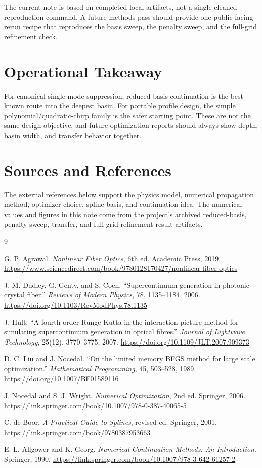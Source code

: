 \documentclass[11pt]{article}
\begin{document}
The current note is based on completed local artifacts, not a single cleaned
reproduction command. A future methods pass should provide one public-facing
rerun recipe that reproduces the basis sweep, the penalty sweep, and the
full-grid refinement check.

\section{Operational Takeaway}

For canonical single-mode suppression, reduced-basis continuation is the best
known route into the deepest basin. For portable profile design, the simple
polynomial/quadratic-chirp family is the safer starting point. These are not the
same design objective, and future optimization reports should always show depth,
basin width, and transfer behavior together.

\section{Sources and References}

The external references below support the physics model, numerical propagation
method, optimizer choice, spline basis, and continuation idea. The numerical
values and figures in this note come from the project's archived reduced-basis,
penalty-sweep, transfer, and full-grid-refinement result artifacts.

\begin{thebibliography}{9}

G. P. Agrawal.
\textit{Nonlinear Fiber Optics}, 6th ed.
Academic Press, 2019.
\url{https://www.sciencedirect.com/book/9780128170427/nonlinear-fiber-optics}

J. M. Dudley, G. Genty, and S. Coen.
``Supercontinuum generation in photonic crystal fiber.''
\textit{Reviews of Modern Physics}, 78, 1135--1184, 2006.
\url{https://doi.org/10.1103/RevModPhys.78.1135}

J. Hult.
``A fourth-order Runge-Kutta in the interaction picture method for simulating
supercontinuum generation in optical fibres.''
\textit{Journal of Lightwave Technology}, 25(12), 3770--3775, 2007.
\url{https://doi.org/10.1109/JLT.2007.909373}

D. C. Liu and J. Nocedal.
``On the limited memory BFGS method for large scale optimization.''
\textit{Mathematical Programming}, 45, 503--528, 1989.
\url{https://doi.org/10.1007/BF01589116}

J. Nocedal and S. J. Wright.
\textit{Numerical Optimization}, 2nd ed.
Springer, 2006.
\url{https://link.springer.com/book/10.1007/978-0-387-40065-5}

C. de Boor.
\textit{A Practical Guide to Splines}, revised ed.
Springer, 2001.
\url{https://link.springer.com/book/9780387953663}

E. L. Allgower and K. Georg.
\textit{Numerical Continuation Methods: An Introduction}.
Springer, 1990.
\url{https://link.springer.com/book/10.1007/978-3-642-61257-2}

\end{thebibliography}
\end{document}
